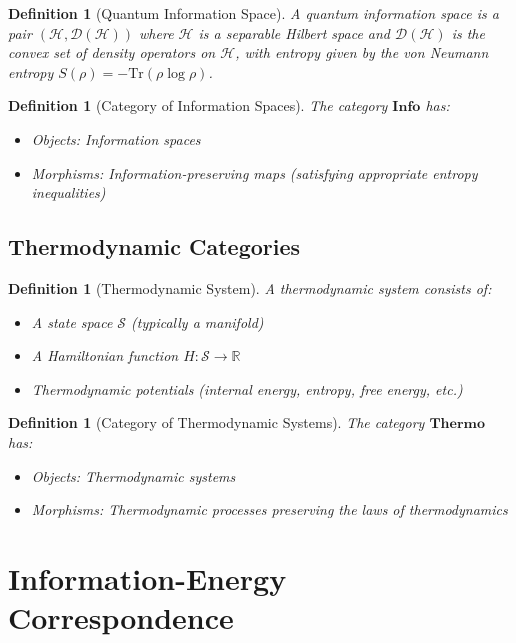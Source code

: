 \documentclass[12pt,a4paper]{article}
\newtheorem{definition}[theorem]{Definition}
\begin{document}
\begin{definition}[Quantum Information Space]
A quantum information space is a pair $(\mathcal{H}, \mathcal{D}(\mathcal{H}))$ where $\mathcal{H}$ is a separable Hilbert space and $\mathcal{D}(\mathcal{H})$ is the convex set of density operators on $\mathcal{H}$, with entropy given by the von Neumann entropy $S(\rho) = -\text{Tr}(\rho \log \rho)$.
\end{definition}

\begin{definition}[Category of Information Spaces]
The category $\mathbf{Info}$ has:
\begin{itemize}
\item Objects: Information spaces
\item Morphisms: Information-preserving maps (satisfying appropriate entropy inequalities)
\end{itemize}
\end{definition}

\subsection{Thermodynamic Categories}

\begin{definition}[Thermodynamic System]
A thermodynamic system consists of:
\begin{itemize}
\item A state space $\mathcal{S}$ (typically a manifold)
\item A Hamiltonian function $H: \mathcal{S} \to \mathbb{R}$
\item Thermodynamic potentials (internal energy, entropy, free energy, etc.)
\end{itemize}
\end{definition}

\begin{definition}[Category of Thermodynamic Systems]
The category $\mathbf{Thermo}$ has:
\begin{itemize}
\item Objects: Thermodynamic systems
\item Morphisms: Thermodynamic processes preserving the laws of thermodynamics
\end{itemize}
\end{definition}

\section{Information-Energy Correspondence}
\end{document}

